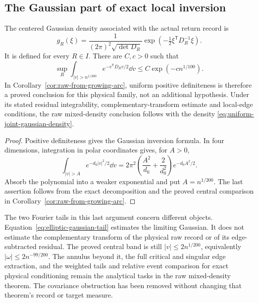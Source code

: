 \subsection{The Gaussian part of exact local inversion}
\begin{corollary}
\label{cor:elliptic-central-inversion}
The centered Gaussian density associated with the actual return record is
\begin{equation}\label{eq:uniform-joint-gaussian-density}
 g_R(\xi)=\frac{1}{(2\pi)^2\sqrt{\det D_R}}
              \exp\!\left(-\tfrac12\xi^{\mathsf T}D_R^{-1}\xi\right).
\end{equation}
It is defined for every $R\in I$. There are $C,c>0$ such that
\begin{equation}\label{eq:elliptic-gaussian-tail}
 \sup_R\int_{|v|>n^{1/200}}
          e^{-v^{\mathsf T}D_Rv/2}\dd v
       \le C\exp(-c n^{1/100}).
\end{equation}
In Corollary~\ref{cor:raw-from-growing-arc}, uniform positive definiteness
is therefore a proved conclusion for this physical family, not an
additional hypothesis. Under its stated residual integrability,
complementary-transform estimate and local-edge conditions, the raw
mixed-density conclusion follows with the density
\eqref{eq:uniform-joint-gaussian-density}.
\end{corollary}
\begin{proof}
Positive definiteness gives the Gaussian inversion formula. In four
dimensions, integration in polar coordinates gives, for $A>0$,
\[
 \int_{|v|>A}e^{-d_0|v|^2/2}\dd v
   =2\pi^2\left(\frac{A^2}{d_0}+\frac{2}{d_0^2}\right)
                         e^{-d_0A^2/2}.
\]
Absorb the polynomial into a weaker exponential and put $A=n^{1/200}$.
The last assertion follows from the exact decomposition and the proved
central comparison in Corollary~\ref{cor:raw-from-growing-arc}.
\end{proof}

The two Fourier tails in this last argument concern different objects.
Equation~\eqref{eq:elliptic-gaussian-tail} estimates the limiting Gaussian.
It does not estimate the complementary transform of the physical raw
record or of its edge-subtracted residual. The proved central band is
still $|v|\le2n^{1/200}$, equivalently
$|\omega|\le2n^{-99/200}$. The annulus beyond it, the full critical and
singular edge extraction, and the weighted tails and relative event
comparison for exact physical conditioning remain the analytical tasks
in the raw mixed-density theorem. The covariance obstruction has been
removed without changing that theorem's record or target measure.
